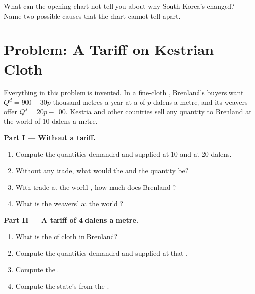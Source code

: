 \begin{exercise}[$\star\star\star$]\label{exo:g9:international-trade:12}
What can the opening chart not tell you about why South Korea's  changed? Name two possible causes
that the chart cannot tell apart.
\end{exercise}

\section{Problem: A Tariff on Kestrian Cloth}

\begin{problem}
\label{pb:g9:international-trade:1}
Everything in this problem is invented. In a fine-cloth , Brenland's buyers want $Q^d = 900 - 30p$
thousand metres a year at a  of $p$ dalens a metre, and its weavers offer $Q^s = 20p - 100$. Kestria
and other countries sell any quantity to Brenland at the world  of 10 dalens a metre.

\medskip
\noindent\textbf{Part I --- Without a tariff.}
\begin{enumerate}
  \item Compute the quantities demanded and supplied at 10 and at 20 dalens.
  \item Without any trade, what would the  and the quantity be?
  \item With trade at the world , how much does Brenland ?
  \item What is the weavers'  at the world ?
\end{enumerate}

\medskip
\noindent\textbf{Part II --- A tariff of 4 dalens a metre.}
\begin{enumerate}[resume]
  \item What is the  of cloth in Brenland?
  \item Compute the quantities demanded and supplied at that .
  \item Compute the .
  \item Compute the state's  from the .
\end{enumerate}


\end{problem}
